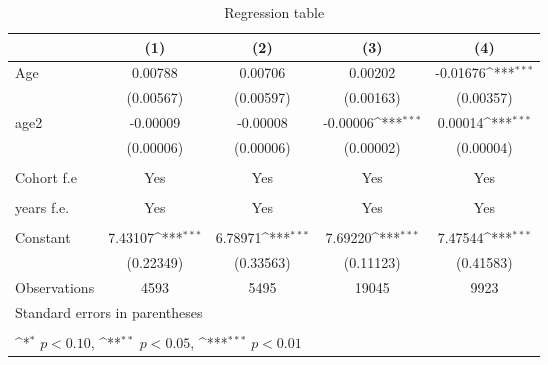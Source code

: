 \begin{table}[htbp]\centering
\def\sym#1{\ifmmode^{#1}\else\(^{#1}\)\fi}
\caption{Regression table \label{reg4}}
\begin{tabular}{l*{4}{c}}
\toprule
                    &\multicolumn{1}{c}{(1)}         &\multicolumn{1}{c}{(2)}         &\multicolumn{1}{c}{(3)}         &\multicolumn{1}{c}{(4)}         \\
\midrule
Age                 &     0.00788         &     0.00706         &     0.00202         &    -0.01676\sym{***}\\
                    &   (0.00567)         &   (0.00597)         &   (0.00163)         &   (0.00357)         \\
\addlinespace
age2                &    -0.00009         &    -0.00008         &    -0.00006\sym{***}&     0.00014\sym{***}\\
                    &   (0.00006)         &   (0.00006)         &   (0.00002)         &   (0.00004)         \\
                    \\
                    Cohort f.e           &       Yes        &      Yes &       Yes        &      Yes \\
                                                \\
                    \addlinespace
                    years f.e.            &       Yes         &       Yes   &       Yes        &      Yes       \\
                                               \\
                    \addlinespace
Constant            &     7.43107\sym{***}&     6.78971\sym{***}&     7.69220\sym{***}&     7.47544\sym{***}\\
                    &   (0.22349)         &   (0.33563)         &   (0.11123)         &   (0.41583)         \\
\midrule
Observations        &        4593         &        5495         &       19045         &        9923         \\
\bottomrule
\multicolumn{5}{l}{\footnotesize Standard errors in parentheses}\\
\multicolumn{5}{l}{\footnotesize }\\
\multicolumn{5}{l}{\footnotesize \sym{*} \(p<0.10\), \sym{**} \(p<0.05\), \sym{***} \(p<0.01\)}\\
\end{tabular}
\end{table}

